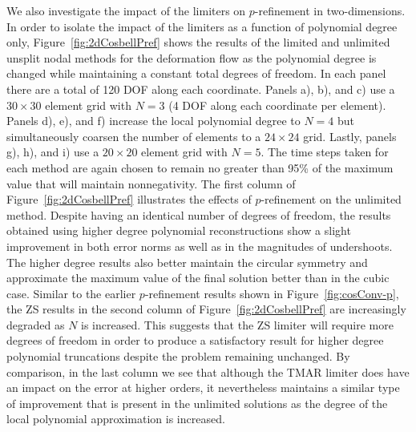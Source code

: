\documentclass{ametsoc}
\begin{document}
We also investigate the impact of the limiters on $p$-refinement in two-dimensions. In order to isolate the impact of the limiters as a function of polynomial degree only, Figure~\ref{fig:2dCosbellPref} shows the results of the limited and unlimited unsplit nodal methods for the deformation flow as the polynomial degree is changed while maintaining a constant total degrees of freedom. In each panel there are a total of 120 DOF along each coordinate. Panels a), b), and c) use a $30 \times 30$ element grid with $N=3$ (4 DOF along each coordinate per element). Panels d), e), and f) increase the local polynomial degree to $N=4$ but simultaneously coarsen the number of elements to a $24 \times 24$ grid. Lastly, panels g), h), and i) use a $20 \times 20$ element grid with $N=5$. The time steps taken for each method are again chosen to remain no greater than 95\% of the maximum value that will maintain nonnegativity. The first column of Figure~\ref{fig:2dCosbellPref} illustrates the effects of $p$-refinement on the unlimited method. Despite having an identical number of degrees of freedom, the results obtained using higher degree polynomial reconstructions show a slight improvement in both error norms as well as in the magnitudes of undershoots. The higher degree results also better maintain the circular symmetry and approximate the maximum value of the final solution better than in the cubic case. Similar to the earlier $p$-refinement results shown in Figure~\ref{fig:cosConv-p}, the ZS results in the second column of Figure~\ref{fig:2dCosbellPref} are increasingly degraded as $N$ is increased. This suggests that the ZS limiter will require more degrees of freedom in order to produce a satisfactory result for higher degree polynomial truncations despite the problem remaining unchanged. By comparison, in the last column we see that although the TMAR limiter does have an impact on the error at higher orders, it nevertheless maintains a similar type of improvement that is present in the unlimited solutions as the degree of the local polynomial approximation is increased.
\end{document}
